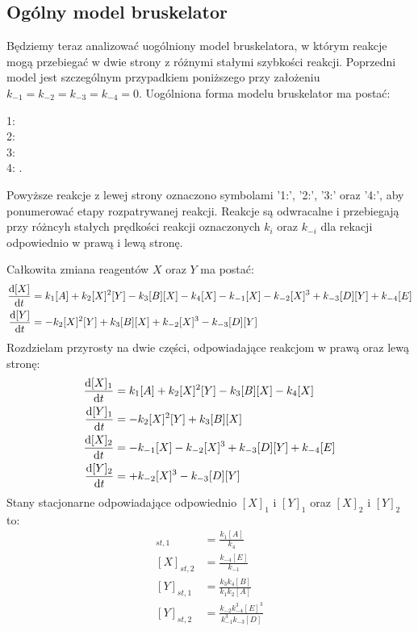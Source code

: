 \documentclass[10pt, a4paper, twoside, onecolumn]{article}
\numberwithin{equation}{section}
\begin{document}
	\subsection{Ogólny model bruskelator}\label{sec:ogolny_model_bruskelator}
	Będziemy teraz analizować uogólniony model bruskelatora, w którym reakcje mogą przebiegać w dwie strony z różnymi stałymi szybkości reakcji. Poprzedni model jest szczególnym przypadkiem poniższego przy założeniu \(k_{-1}=k_{-2}=k_{-3}=k_{-4}=0\). 
	Uogólniona forma modelu bruskelator ma postać:
	\begin{center}
		1:  \\
		2:  \\
		3:  \\
		4: .
	\end{center}
	Powyższe reakcje z lewej strony oznaczono symbolami '1:', '2:', '3:' oraz '4:', aby ponumerować etapy rozpatrywanej reakcji. \newline
	Reakcje są odwracalne i przebiegają przy różncyh stałych prędkości reakcji oznaczonych \(k_{i}\) oraz \(k_{-i}\) dla rekacji odpowiednio w prawą i lewą stronę. \par
	Całkowita zmiana reagentów \(X\) oraz \(Y\) ma postać:
	\begin{align}
		\dv{[X]}{t} &= k_{1}[A] + k_{2}[X]^{2}[Y] - k_{3}[B][X] - k_{4}[X] - k_{-1}[X] - k_{-2}[X]^{3} + k_{-3}[D][Y] + k_{-4}[E] \\
		\dv{[Y]}{t} &= - k_{2}[X]^{2}[Y] + k_{3}[B][X] + k_{-2}[X]^{3} - k_{-3}[D][Y]
	\end{align}
	Rozdzielam przyrosty na dwie części, odpowiadające reakcjom w prawą oraz lewą stronę:
	\begin{align}
		\dv{[X]_{1}}{t} &= k_{1}[A] + k_{2}[X]^{2}[Y] - k_{3}[B][X] - k_{4}[X] \\
		\dv{[Y]_{1}}{t} &= - k_{2}[X]^{2}[Y] + k_{3}[B][X] \\
		\dv{[X]_{2}}{t} &= - k_{-1}[X] - k_{-2}[X]^{3} + k_{-3}[D][Y] + k_{-4}[E] \\
		\dv{[Y]_{2}}{t} &= + k_{-2}[X]^{3} - k_{-3}[D][Y]
	\end{align}
	Stany stacjonarne odpowiadające odpowiednio \([X]_{1}\) i \([Y]_{1}\) oraz \([X]_{2}\) i \([Y]_{2}\) to:
	\begin{align}
		[X]_{st, 1} &= \frac{k_{1}[A]}{k_{4}} \\
		[X]_{st, 2} &= \frac{k_{-4}[E]}{k_{-1}} \\
		[Y]_{st, 1} &= \frac{k_{3}k_{4}[B]}{k_{1}k_{2}[A]} \\
		[Y]_{st, 2} &= \frac{k_{-2}k_{-4}^{3}[E]^{3}}{k_{-1}^{3}k_{-3}[D]}
	\end{align}
\end{document}
